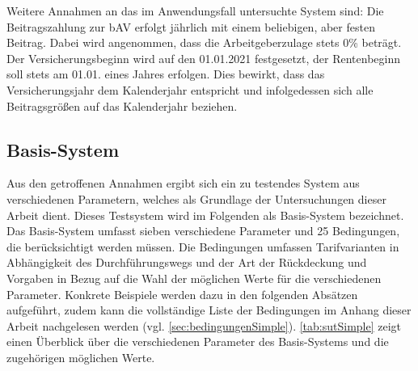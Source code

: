 Weitere Annahmen an das im Anwendungsfall untersuchte System sind: Die Beitragszahlung zur bAV erfolgt jährlich mit einem beliebigen, aber festen Beitrag. Dabei wird angenommen, dass die Arbeitgeberzulage stets 0\% beträgt. Der Versicherungsbeginn wird auf den 01.01.2021 festgesetzt, der Rentenbeginn soll stets am 01.01. eines Jahres erfolgen. Dies bewirkt, dass das Versicherungsjahr dem Kalenderjahr entspricht und infolgedessen sich alle Beitragsgrößen auf das Kalenderjahr beziehen.


\subsection{Basis-System}\label{subsec:ImplBasisModell}

Aus den getroffenen Annahmen ergibt sich ein zu testendes System aus verschiedenen Parametern, welches als Grundlage der Untersuchungen dieser Arbeit dient. Dieses Testsystem wird im Folgenden als \glqq Basis-System\grqq{} bezeichnet. Das Basis-System umfasst sieben verschiedene Parameter und 25 Bedingungen, die berücksichtigt werden müssen. Die Bedingungen umfassen Tarifvarianten in Abhängigkeit des Durchführungswegs und der Art der Rückdeckung und Vorgaben in Bezug auf die Wahl der möglichen Werte für die verschiedenen Parameter. Konkrete Beispiele werden dazu in den folgenden Absätzen aufgeführt, zudem kann die vollständige Liste der Bedingungen im Anhang dieser Arbeit nachgelesen werden (vgl. \autoref{sec:bedingungenSimple}). \autoref{tab:sutSimple} zeigt einen Überblick über die verschiedenen Parameter des Basis-Systems und die zugehörigen möglichen Werte.


